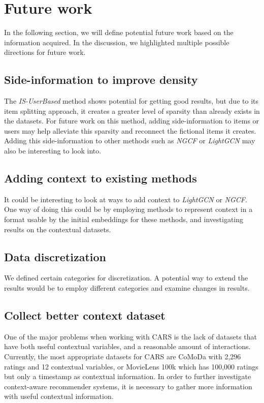 \section{Future work}\label{sec:futurework}
In the following section, we will define potential future work based on the information acquired.
In the discussion, we highlighted multiple possible directions for future work.

\subsection{Side-information to improve density}
The \textit{IS-UserBased} method shows potential for getting good results, but due to its item splitting approach, it creates a greater level of sparsity than already exists in the datasets.
For future work on this method, adding side-information to items or users may help alleviate this sparsity and reconnect the fictional items it creates.
Adding this side-information to other methods such as \textit{NGCF} or \textit{LightGCN} may also be interesting to look into.

\subsection{Adding context to existing methods}
It could be interesting to look at ways to add context to \textit{LightGCN} or \textit{NGCF}.
One way of doing this could be by employing methods to represent context in a format usable by the initial embeddings for these methods, and investigating results on the contextual datasets.

\subsection{Data discretization}
We defined certain categories for discretization.
A potential way to extend the results would be to employ different categories and examine changes in results.

\subsection{Collect better context dataset}
One of the major problems when working with CARS is the lack of datasets that have both useful contextual variables, and a reasonable amount of interactions.
Currently, the most appropriate datasets for CARS are CoMoDa with 2,296 ratings and 12 contextual variables, or MovieLens 100k which has 100,000 ratings but only a timestamp as contextual information.
In order to further investigate context-aware recommender systems, it is necessary to gather more information with useful contextual information.

